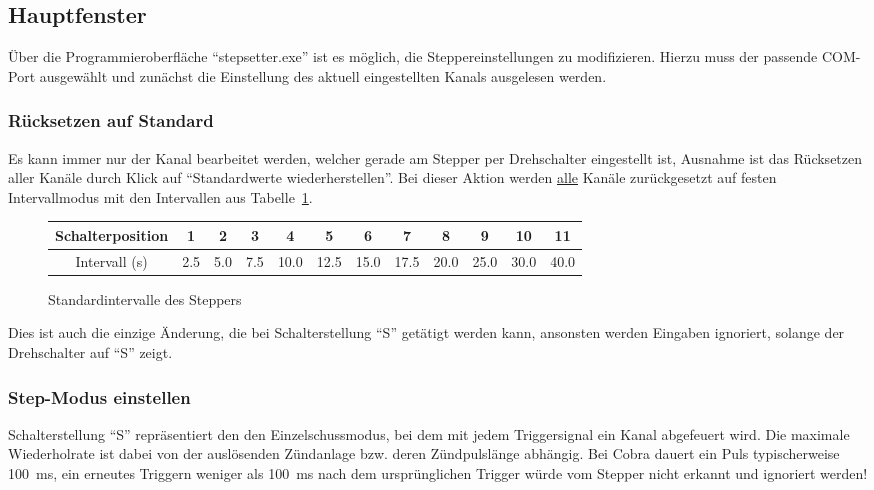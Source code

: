 \documentclass[paper=a4, open=any]{scrbook}
\begin{document}
			\subsection{Hauptfenster}
				Über die Programmieroberfläche \enquote{stepsetter.exe} ist es möglich, die Steppereinstellungen zu modifizieren. Hierzu muss der passende COM-Port ausgewählt und zunächst die Einstellung des aktuell eingestellten Kanals ausgelesen werden.

				\subsubsection*{Rücksetzen auf Standard}
				Es kann immer nur der Kanal bearbeitet werden, welcher gerade am Stepper per Drehschalter eingestellt ist, Ausnahme ist das Rücksetzen aller Kanäle durch Klick auf \enquote{Standardwerte wiederherstellen}. Bei dieser Aktion werden \underline{alle} Kanäle zurückgesetzt auf festen Intervallmodus mit den Intervallen aus Tabelle~\ref{tab:standardintervalle}.

				\begin{figure}
					\begin{center}
						\begin{longtabu} [c]{c|*{11}c}
							Schalterposition & 1   & 2   & 3   & 4    & 5    & 6    & 7    & 8    & 9    & 10   & 11   \\ \hline
							Intervall (s)    & 2.5 & 5.0 & 7.5 & 10.0 & 12.5 & 15.0 & 17.5 & 20.0 & 25.0 & 30.0 & 40.0
						\end{longtabu}
					\end{center}
					\caption{Standardintervalle des Steppers}
					\label{tab:standardintervalle}
				\end{figure}

				Dies ist auch die einzige Änderung, die bei Schalterstellung \enquote{S} getätigt werden kann, ansonsten werden Eingaben ignoriert, solange der Drehschalter auf \enquote{S} zeigt.

			\subsubsection*{Step-Modus einstellen}
			
				Schalterstellung \enquote{S} repräsentiert den den Einzelschussmodus, bei dem mit jedem Triggersignal ein Kanal abgefeuert wird. Die maximale Wiederholrate ist dabei von der auslösenden Zündanlage bzw. deren Zündpulslänge abhängig. Bei Cobra dauert ein Puls typischerweise \SI{100}{\milli\second}, ein erneutes Triggern weniger als \SI{100}{\milli\second} nach dem ursprünglichen Trigger würde vom Stepper nicht erkannt und ignoriert werden!
				
\end{document}
